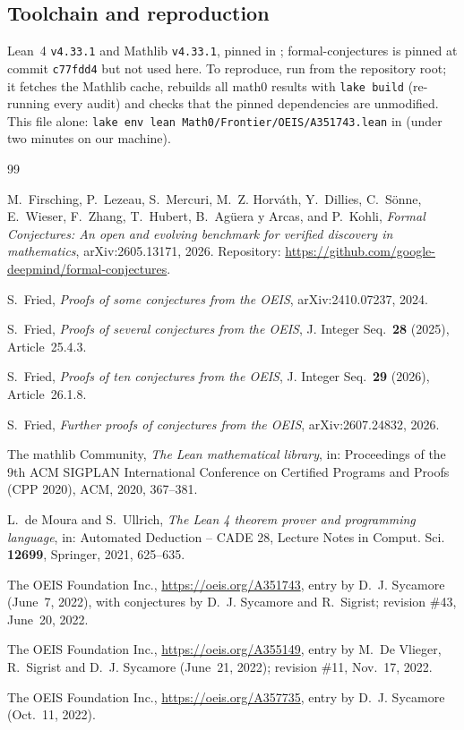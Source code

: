 \documentclass[11pt]{amsart}
\theoremstyle{plain}
\theoremstyle{definition}
\begin{document}
\subsection*{Toolchain and reproduction}
Lean~4 \cite{Lean4} \texttt{v4.33.1} and Mathlib \cite{Mathlib} \texttt{v4.33.1}, pinned in ; formal-conjectures \cite{FC} is pinned at commit \texttt{c77fdd4} but not used here.
To reproduce, run  from the repository root; it fetches the Mathlib cache, rebuilds all math0 results with \texttt{lake build} (re-running every audit) and checks that the pinned dependencies are unmodified. This file alone: \texttt{lake env lean Math0/Frontier/OEIS/A351743.lean} in  (under two minutes on our machine).

{\footnotesize
\begin{thebibliography}{99}

M.~Firsching, P.~Lezeau, S.~Mercuri, M.~Z. Horv\'ath, Y.~Dillies, C.~S\"onne, E.~Wieser, F.~Zhang, T.~Hubert, B.~Ag\"uera y Arcas, and P.~Kohli, \emph{Formal Conjectures: An open and evolving benchmark for verified discovery in mathematics}, arXiv:2605.13171, 2026. Repository: \url{https://github.com/google-deepmind/formal-conjectures}.

S.~Fried, \emph{Proofs of some conjectures from the OEIS}, arXiv:2410.07237, 2024.

S.~Fried, \emph{Proofs of several conjectures from the OEIS}, J. Integer Seq.\ \textbf{28} (2025), Article~25.4.3.

S.~Fried, \emph{Proofs of ten conjectures from the OEIS}, J. Integer Seq.\ \textbf{29} (2026), Article~26.1.8.

S.~Fried, \emph{Further proofs of conjectures from the OEIS}, arXiv:2607.24832, 2026.

The mathlib Community, \emph{The Lean mathematical library}, in: Proceedings of the 9th ACM SIGPLAN International Conference on Certified Programs and Proofs (CPP 2020), ACM, 2020, 367--381.

L.~de Moura and S.~Ullrich, \emph{The Lean 4 theorem prover and programming language}, in: Automated Deduction -- CADE 28, Lecture Notes in Comput. Sci. \textbf{12699}, Springer, 2021, 625--635.

The OEIS Foundation Inc., \url{https://oeis.org/A351743}, entry by D.~J. Sycamore (June~7, 2022), with conjectures by D.~J. Sycamore and R.~Sigrist; revision \#43, June~20, 2022.

The OEIS Foundation Inc., \url{https://oeis.org/A355149}, entry by M.~De Vlieger, R.~Sigrist and D.~J. Sycamore (June~21, 2022); revision \#11, Nov.~17, 2022.

The OEIS Foundation Inc., \url{https://oeis.org/A357735}, entry by D.~J. Sycamore (Oct.~11, 2022).

\end{thebibliography}
}
\end{document}
